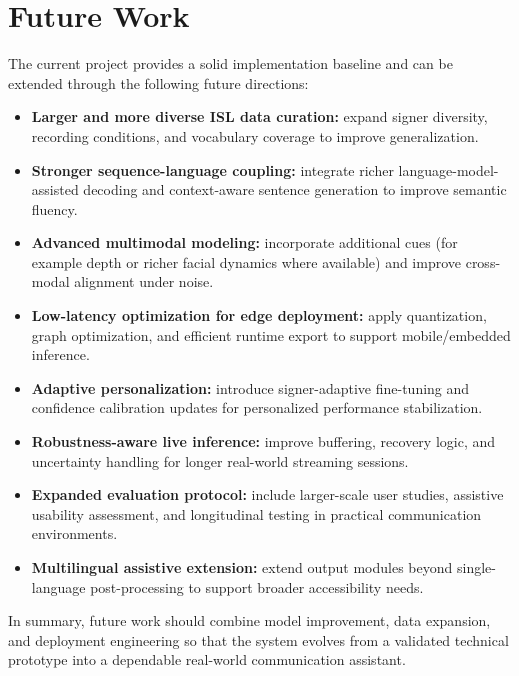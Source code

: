 \section{Future Work}
The current project provides a solid implementation baseline and can be extended through the following future directions:

\begin{itemize}[leftmargin=1.5em]
\item \textbf{Larger and more diverse ISL data curation:} expand signer diversity, recording conditions, and vocabulary coverage to improve generalization.
\item \textbf{Stronger sequence-language coupling:} integrate richer language-model-assisted decoding and context-aware sentence generation to improve semantic fluency.
\item \textbf{Advanced multimodal modeling:} incorporate additional cues (for example depth or richer facial dynamics where available) and improve cross-modal alignment under noise.
\item \textbf{Low-latency optimization for edge deployment:} apply quantization, graph optimization, and efficient runtime export to support mobile/embedded inference.
\item \textbf{Adaptive personalization:} introduce signer-adaptive fine-tuning and confidence calibration updates for personalized performance stabilization.
\item \textbf{Robustness-aware live inference:} improve buffering, recovery logic, and uncertainty handling for longer real-world streaming sessions.
\item \textbf{Expanded evaluation protocol:} include larger-scale user studies, assistive usability assessment, and longitudinal testing in practical communication environments.
\item \textbf{Multilingual assistive extension:} extend output modules beyond single-language post-processing to support broader accessibility needs.
\end{itemize}

In summary, future work should combine model improvement, data expansion, and deployment engineering so that the system evolves from a validated technical prototype into a dependable real-world communication assistant.
